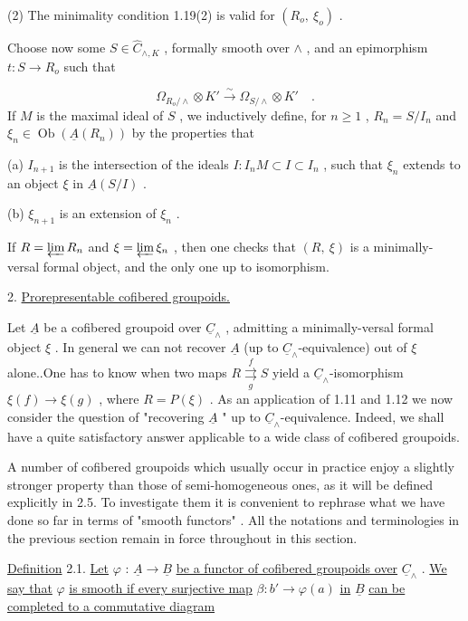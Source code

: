 (2)  The minimality condition 1.19(2)  is valid for  $(R_o,\ \xi_o)$  .

Choose now some  $S \in \hat{C}_{\wedge,K}$ , formally smooth over  $\wedge$ , and an epimorphism $t : S \longrightarrow R_o$  such that

\begin{equation*}
\Omega_{R_o/\wedge} \otimes K' \overset{\sim}{\longrightarrow} \Omega_{S/\wedge} \otimes K' \quad .
\end{equation*}
If  $M$  is the maximal ideal of  $S$ , we inductively define, for  $n \geq 1$ , $R_n = S/I_n$  and  $\xi_n \in \operatorname{Ob}(\underline{A}(R_n))$  by the properties that

(a)  $I_{n+1}$  is the intersection of the ideals  $I : I_n M \subset I \subset I_n$ , such that  $\xi_n$ extends to an object  $\xi$  in  $\underline{A}(S/I)$  .

(b)  $\xi_{n+1}$  is an extension of  $\xi_n$  .

If  $R = \varprojlim R_n$  and  $\xi = \varprojlim \xi_n$ , then one checks that  $(R,\ \xi)$  is a minimally-versal formal object, and the only one up to isomorphism.


2. \underline{Prorepresentable cofibered groupoids.}

Let  $\underline{A}$  be a cofibered groupoid over  $\underline{C}_\wedge$ , admitting a minimally-versal formal object  $\xi$ . In general we can not recover  $\underline{A}$  (up to  $\underline{C}_\wedge$-equivalence) out of  $\xi$  alone..One has to know when two maps  $R \overset{f}{\underset{g}{\rightrightarrows}} S$  yield a  $\underline{C}_\wedge$-isomorphism $\xi(f) \longrightarrow \xi(g)$ , where  $R = P(\xi)$ . As an application of 1.11  and 1.12 we now consider the question of  "recovering  $\underline{A}$ "  up to  $\underline{C}_\wedge$-equivalence. Indeed, we
shall have a quite satisfactory answer applicable to a wide class of cofibered groupoids.

A number of cofibered groupoids which usually occur in practice enjoy a slightly stronger property than those of semi-homogeneous ones, as it will be defined explicitly in 2.5. To investigate them it is convenient to rephrase what we have done so far in terms of  "smooth functors" . All the notations and terminologies in the previous section remain in force throughout in this section.

\underline{Definition} 2.1.  \underline{Let}  $\varphi$ : $\underline{A} \longrightarrow \underline{B}$  \underline{be a functor of cofibered groupoids over}  $\underline{C}_\wedge$ . \underline{We say that}  $\varphi$  \underline{is smooth if every surjective map}  $\beta : b' \longrightarrow \varphi(a)$  \underline{in}  $\underline{B}$  \underline{can be completed to a commutative diagram}


